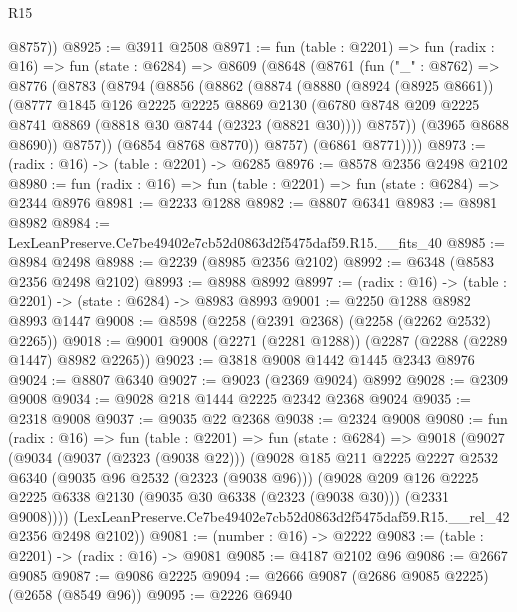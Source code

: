 \begin{lexlean}{R15}
\begin{coremodule}
        @8757))
@8925 := @3911 @2508
@8971 := fun (table : @2201) =>
  fun (radix : @16) =>
  fun (state : @6284) =>
  @8609
    (@8648
      (@8761
        (fun ("_" : @8762) =>
        @8776
          (@8783
            (@8794
              (@8856
                (@8862
                  (@8874
                    (@8880
                      (@8924 (@8925 @8661))
                      (@8777
                        @1845
                        @126
                        @2225
                        @2225
                        @8869
                        @2130
                        (@6780 @8748 @209 @2225 @8741 @8869 (@8818 @30 @8744 (@2323 (@8821 @30))))
                        @8757))
                    (@3965 @8688 @8690))
                  @8757))
              (@6854 @8768 @8770))
            @8757)
          (@6861 @8771))))
@8973 := (radix : @16) -> (table : @2201) -> @6285
@8976 := @8578 @2356 @2498 @2102
@8980 := fun (radix : @16) => fun (table : @2201) => fun (state : @6284) => @2344 @8976
@8981 := @2233 @1288
@8982 := @8807 @6341
@8983 := @8981 @8982
@8984 := LexLeanPreserve.Ce7be49402e7cb52d0863d2f5475daf59.R15.__fits_40
@8985 := @8984 @2498
@8988 := @2239 (@8985 @2356 @2102)
@8992 := @6348 (@8583 @2356 @2498 @2102)
@8993 := @8988 @8992
@8997 := (radix : @16) -> (table : @2201) -> (state : @6284) -> @8983 @8993
@9001 := @2250 @1288 @8982 @8993 @1447
@9008 := @8598 (@2258 (@2391 @2368) (@2258 (@2262 @2532) @2265))
@9018 := @9001 @9008 (@2271 (@2281 @1288)) (@2287 (@2288 (@2289 @1447) @8982 @2265))
@9023 := @3818 @9008 @1442 @1445 @2343 @8976
@9024 := @8807 @6340
@9027 := @9023 (@2369 @9024) @8992
@9028 := @2309 @9008
@9034 := @9028 @218 @1444 @2225 @2342 @2368 @9024
@9035 := @2318 @9008
@9037 := @9035 @22 @2368
@9038 := @2324 @9008
@9080 := fun (radix : @16) =>
  fun (table : @2201) =>
  fun (state : @6284) =>
  @9018
    (@9027
      (@9034
        (@9037 (@2323 (@9038 @22)))
        (@9028
          @185
          @211
          @2225
          @2227
          @2532
          @6340
          (@9035 @96 @2532 (@2323 (@9038 @96)))
          (@9028
            @209
            @126
            @2225
            @2225
            @6338
            @2130
            (@9035 @30 @6338 (@2323 (@9038 @30)))
            (@2331 @9008))))
      (LexLeanPreserve.Ce7be49402e7cb52d0863d2f5475daf59.R15.__rel_42 @2356 @2498 @2102))
@9081 := (number : @16) -> @2222
@9083 := (table : @2201) -> (radix : @16) -> @9081
@9085 := @4187 @2102 @96
@9086 := @2667 @9085
@9087 := @9086 @2225
@9094 := @2666 @9087 (@2686 @9085 @2225) (@2658 (@8549 @96))
@9095 := @2226 @6940

\end{coremodule}
\end{lexlean}
